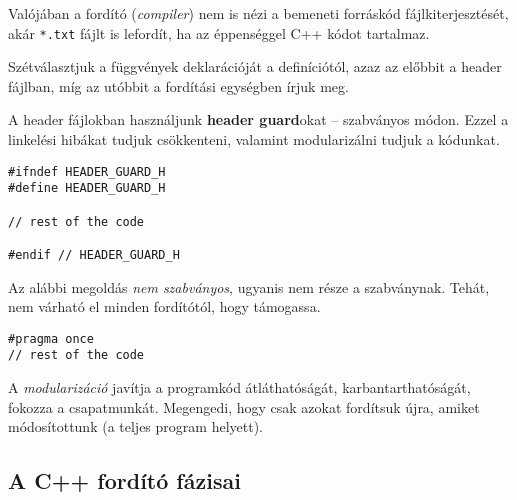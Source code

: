 \documentclass[a4paper, 11pt, oneside]{book}
\begin{document}
Valójában a fordító (\textit{compiler}) nem is nézi a bemeneti forráskód fájlkiterjesztését, akár \verb*|*.txt| fájlt is lefordít, ha az éppenséggel C++ kódot tartalmaz.

Szétválasztjuk a függvények deklarációját a definíciótól, azaz az előbbit a header fájlban, míg az utóbbit a fordítási egységben írjuk meg.

A header fájlokban használjunk \textbf{header guard}okat -- szabványos módon. Ezzel a linkelési hibákat tudjuk csökkenteni, valamint modularizálni tudjuk a kódunkat.

\begin{lstlisting}[style=cppstyle, caption={Szabványos header guard}]
#ifndef HEADER_GUARD_H
#define HEADER_GUARD_H

// rest of the code

#endif // HEADER_GUARD_H
\end{lstlisting}

Az alábbi megoldás \textit{nem szabványos}, ugyanis nem része a szabványnak. Tehát, nem várható el minden fordítótól, hogy támogassa.

\begin{lstlisting}[style=cppstyle, caption={Nem-szabványos header guard}]
#pragma once
// rest of the code
\end{lstlisting}

A \textit{modularizáció} javítja a programkód átláthatóságát, karbantarthatóságát, fokozza a csapatmunkát. Megengedi, hogy csak azokat fordítsuk újra, amiket módosítottunk (a teljes program helyett).


\subsection{A C++ fordító fázisai}
\end{document}
